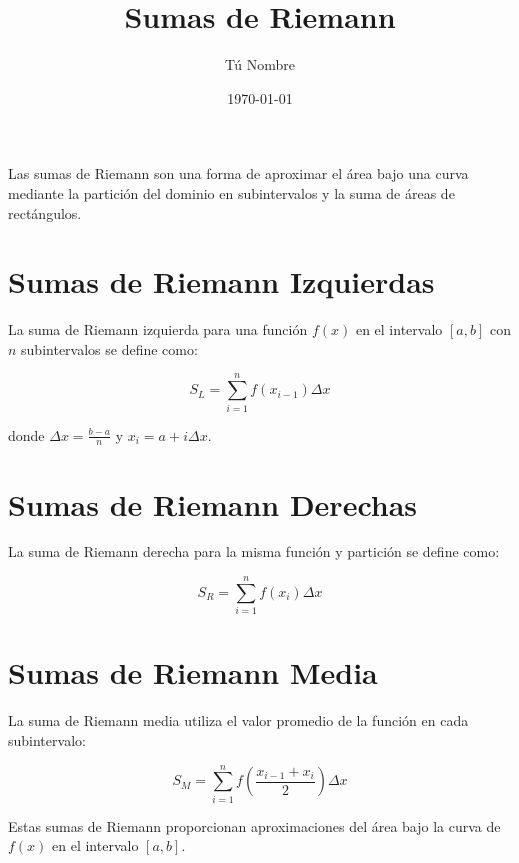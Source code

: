 \documentclass{article}
\begin{document}
\title{Sumas de Riemann}
\author{Tú Nombre}
\date{\today}
\maketitle

Las sumas de Riemann son una forma de aproximar el área bajo una curva mediante la partición del dominio en subintervalos y la suma de áreas de rectángulos.

\section{Sumas de Riemann Izquierdas}

La suma de Riemann izquierda para una función $f(x)$ en el intervalo $[a, b]$ con $n$ subintervalos se define como:

\[
S_L = \sum_{i=1}^{n} f(x_{i-1}) \Delta x
\]

donde $\Delta x = \frac{b-a}{n}$ y $x_i = a + i \Delta x$.

\section{Sumas de Riemann Derechas}

La suma de Riemann derecha para la misma función y partición se define como:

\[
S_R = \sum_{i=1}^{n} f(x_i) \Delta x
\]

\section{Sumas de Riemann Media}

La suma de Riemann media utiliza el valor promedio de la función en cada subintervalo:

\[
S_M = \sum_{i=1}^{n} f\left(\frac{x_{i-1}+x_i}{2}\right) \Delta x
\]

Estas sumas de Riemann proporcionan aproximaciones del área bajo la curva de $f(x)$ en el intervalo $[a, b]$.
\end{document}
